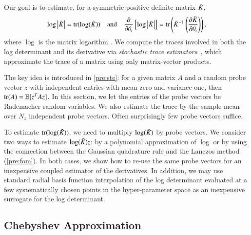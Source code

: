 Our goal is to estimate, for a symmetric positive definite matrix $\tilde{K}_{}$,
\begin{equation}\label{eqn:ldnd}
  \log\left\lvert\tilde{K}_{}\right\rvert = \operatorname{tr}(\log(\tilde{K}_{})) \quad \mbox{and} \quad \frac{\partial}
  {\partial \theta_i} \left[\log\left\lvert\tilde{K}_{}\right\rvert\right] = \operatorname{tr}\left( \tilde{K}_{}^{-1}
  \left(\frac{\partial \tilde{K}_{}}{\partial \theta_i} \right) \right),
\end{equation}
where $\log$ is the matrix logarithm \cite{higham2008functions}. We compute the
traces involved in both the log determinant and its derivative via {\em
stochastic trace estimators}~\cite{hutchinson1990stochastic}, which approximate
the trace of a matrix using only matrix\hyp{}vector products.

The key idea is introduced in \cref{pre:ste}: for a given matrix $A$ and
a random probe vector $z$ with independent entries with mean zero and variance
one, then $\operatorname{tr}(A) = \operatorname{\mathbb{E}}[z^TAz]$. In this section, we let the entries of the
probe vectors be Rademacher random variables. We also estimate the trace by the
sample mean over $N_z$ independent probe vectors. Often surprisingly few probe
vectors suffice.

To estimate $\operatorname{tr}(\log(\tilde{K}_{}))$, we need to multiply $\log(\tilde{K}_{})$ by probe
vectors. We consider two ways to estimate $\log(\tilde{K}_{})z$: by a polynomial
approximation of $\log$ or by using the connection between the Gaussian
quadrature rule and the Lanczos method \cite{han2015large,ubarufast} 
(\cref{pre:fom}). In both cases, we show how to re-use the same probe vectors
for an inexpensive coupled estimator of the derivatives. In addition, we may use
standard radial basis function interpolation of the log determinant evaluated at
a few systematically chosen points in the hyper\hyp{}parameter space as an
inexpensive surrogate for the log determinant.

\subsection{Chebyshev Approximation}\label{sgpsec:che}

